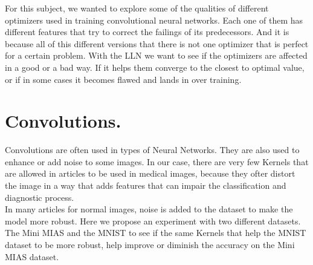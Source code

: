 \documentclass{article}
\begin{document}
For this subject, we wanted to explore some of the qualities of different optimizers used in training convolutional neural networks. Each one of them has different features that try to correct the failings of its predecessors. And it is because all of this different versions that there is not one optimizer that is perfect for a certain problem. With the LLN we want to see if the optimizers are affected in a good or a bad way. If it helps them converge to the closest to optimal value, or if in some cases it becomes flawed and lands in over training.


\section{Convolutions.}


Convolutions are often used in types of Neural Networks. They are also used to enhance or add noise to some images. In our case, there are very few Kernels that are allowed in articles to be used in medical images, because they ofter distort the image in a way that adds features that can impair the classification and diagnostic process. \\

In many articles for normal images, noise is added to the dataset to make the model more robust. Here we propose an experiment with two different datasets. The Mini MIAS and the MNIST to see if the same Kernels that help the MNIST dataset to be more robust, help improve or diminish the accuracy on the Mini MIAS dataset.\\


 
\end{document}
